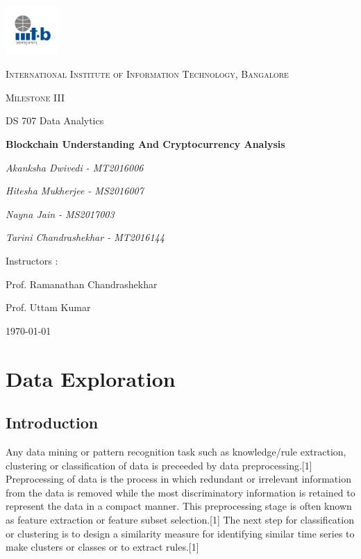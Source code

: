 \documentclass{article}
\begin{document}
\begin{titlepage}
	\centering
	\includegraphics[width=0.15\textwidth]{IIIT-B_logo.jpg}\par\vspace{1cm}
	{\scshape\LARGE International Institute of Information Technology, Bangalore \par}
	\vspace{1cm}
	{\scshape\Large Milestone III\par}
	{\Large  DS 707 Data Analytics\par}
	\vspace{1.5cm}
	{\huge\bfseries Blockchain Understanding And Cryptocurrency Analysis \par}
	\vspace{2cm}
	{\Large\itshape Akanksha Dwivedi - MT2016006\par}
	{\Large\itshape Hitesha Mukherjee - MS2016007\par}
	{\Large\itshape Nayna Jain - MS2017003\par}
	{\Large\itshape Tarini Chandrashekhar - MT2016144\par}
	\vfill
	Instructors : \par
	Prof. Ramanathan Chandrashekhar
	\par
	Prof. Uttam Kumar

	\vfill
	{\large \today\par}
\end{titlepage}

\newpage

\tableofcontents

\newpage
\justify



\section{Data Exploration}

\subsection {Introduction}
Any data mining or pattern recognition task such as
knowledge/rule extraction, clustering or classification of data is preceeded by data preprocessing.[1] Preprocessing of data is the process in which redundant or irrelevant information from the data is removed while the most discriminatory information is retained to represent the data in a compact manner. This preprocessing stage is often known as feature extraction or feature subset selection.[1] The next step for classification or clustering is to design a similarity measure for identifying similar time series to make clusters or classes or to extract rules.[1]
\end{document}
